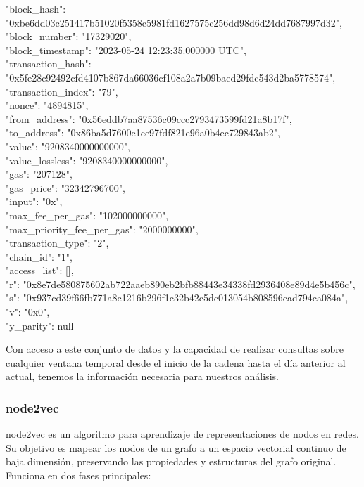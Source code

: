 \documentclass{article}
\begin{document}
\begin{tabbing}
  "block\_hash": "0xbe6dd03c251417b51020f5358c5981fd1627575c256dd98d6d24dd7687997d32",\\
  "block\_number": "17329020", \\
  "block\_timestamp": "2023-05-24 12:23:35.000000 UTC",\\
  "transaction\_hash": "0x5fe28c92492cfd4107b867da66036cf108a2a7b09baed29fdc543d2ba5778574",\\
  "transaction\_index": "79",\\
  "nonce": "4894815",\\
  "from\_address": "0x56eddb7aa87536c09ccc2793473599fd21a8b17f",\\
  "to\_address": "0x86ba5d7600e1ce97fdf821e96a0b4ec729843ab2",\\
  "value": "9208340000000000",\\
  "value\_lossless": "9208340000000000",\\
  "gas": "207128",\\
  "gas\_price": "32342796700",\\
  "input": "0x",\\
  "max\_fee\_per\_gas": "102000000000",\\
  "max\_priority\_fee\_per\_gas": "2000000000",\\
  "transaction\_type": "2",\\
  "chain\_id": "1",\\
  "access\_list": [],\\
  "r": "0x8e7de580875602ab722aaeb890eb2bfb88443e34338fd2936408e89d4e5b456c",\\
  "s": "0x937cd39f66fb771a8c1216b296f1c32b42c5dc013054b808596cad794ca084a",\\
  "v": "0x0",\\
  "y\_parity": null\\

\end{tabbing}


 Con acceso a este conjunto de datos y la capacidad de realizar consultas sobre cualquier ventana temporal desde el inicio de la cadena hasta el día anterior al actual, tenemos la información necesaria para nuestros análisis.

\subsubsection{node2vec}
node2vec es un algoritmo para aprendizaje de representaciones de nodos en redes. Su objetivo es mapear los nodos de un grafo a un espacio vectorial continuo de baja dimensión, preservando las propiedades y estructuras del grafo original. Funciona en dos fases principales:
\end{document}
